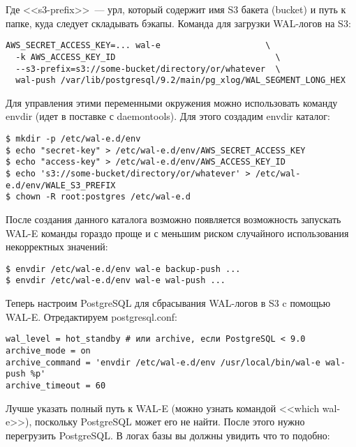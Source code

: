 Где <<s3-prefix>>~--- урл, который содержит имя S3 бакета (bucket) и путь к папке, куда следует складывать бэкапы. Команда для загрузки WAL-логов на S3:

\begin{lstlisting}[label=lst:wal-e4,caption=Загрузка WAL-логов на S3]
AWS_SECRET_ACCESS_KEY=... wal-e                     \
  -k AWS_ACCESS_KEY_ID                                \
  --s3-prefix=s3://some-bucket/directory/or/whatever  \
  wal-push /var/lib/postgresql/9.2/main/pg_xlog/WAL_SEGMENT_LONG_HEX
\end{lstlisting}

Для управления этими переменными окружения можно использовать команду envdir (идет в поставке с daemontools). Для этого создадим envdir каталог:

\begin{lstlisting}[label=lst:wal-e5,caption=WAL-E с envdir]
$ mkdir -p /etc/wal-e.d/env
$ echo "secret-key" > /etc/wal-e.d/env/AWS_SECRET_ACCESS_KEY
$ echo "access-key" > /etc/wal-e.d/env/AWS_ACCESS_KEY_ID
$ echo 's3://some-bucket/directory/or/whatever' > /etc/wal-e.d/env/WALE_S3_PREFIX
$ chown -R root:postgres /etc/wal-e.d
\end{lstlisting}

После создания данного каталога возможно появляется возможность запускать WAL-E команды гораздо проще и с меньшим риском случайного использования некорректных значений:

\begin{lstlisting}[label=lst:wal-e6,caption=WAL-E с envdir]
$ envdir /etc/wal-e.d/env wal-e backup-push ...
$ envdir /etc/wal-e.d/env wal-e wal-push ...
\end{lstlisting}

Теперь настроим PostgreSQL для сбрасывания WAL-логов в S3 c помощью WAL-E. Отредактируем postgresql.conf:

\begin{lstlisting}[label=lst:wal-e7,caption=Настройка PostgreSQL]
wal_level = hot_standby # или archive, если PostgreSQL < 9.0
archive_mode = on
archive_command = 'envdir /etc/wal-e.d/env /usr/local/bin/wal-e wal-push %p'
archive_timeout = 60
\end{lstlisting}

Лучше указать полный путь к WAL-E (можно узнать командой <<which wal-e>>), поскольку PostgreSQL может его не найти. После этого нужно перегрузить PostgreSQL. В логах базы вы должны увидить что то подобно:

